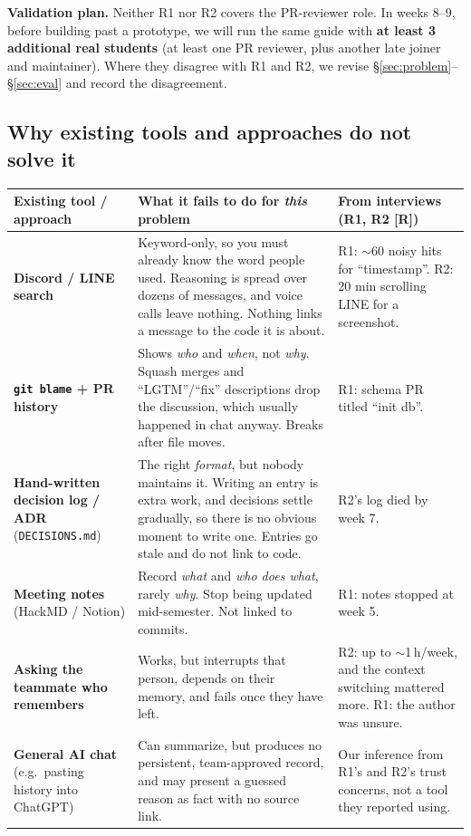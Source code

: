 \documentclass[11pt,a4paper]{article}
\newcommand{\code}[1]{\texttt{#1}}
\begin{document}
\textbf{Validation plan.} Neither R1 nor R2 covers the PR-reviewer role. In weeks 8--9, before building past a prototype, we will run the same guide with \textbf{at least 3 additional real students} (at least one PR reviewer, plus another late joiner and maintainer). Where they disagree with R1 and R2, we revise \S\ref{sec:problem}--\S\ref{sec:eval} and record the disagreement.

\subsection{Why existing tools and approaches do not solve it}\label{sec:existing}

{\small
\begin{tabularx}{\linewidth}{@{}>{\raggedright\arraybackslash}p{3.1cm}L>{\raggedright\arraybackslash}p{4.0cm}@{}}
\toprule
\textbf{Existing tool / approach} & \textbf{What it fails to do for \emph{this} problem} & \textbf{From interviews} (R1, R2 [R])\\
\midrule
\textbf{Discord / LINE search} & Keyword-only, so you must already know the word people used. Reasoning is spread over dozens of messages, and voice calls leave nothing. Nothing links a message to the code it is about. & R1: $\sim$60 noisy hits for ``timestamp''. R2: 20 min scrolling LINE for a screenshot.\\
\textbf{\code{git blame} + PR history} & Shows \emph{who} and \emph{when}, not \emph{why}. Squash merges and ``LGTM''/``fix'' descriptions drop the discussion, which usually happened in chat anyway. Breaks after file moves. & R1: schema PR titled ``init db''.\\
\textbf{Hand-written decision log / ADR} (\code{DECISIONS.md}) & The right \emph{format}, but nobody maintains it. Writing an entry is extra work, and decisions settle gradually, so there is no obvious moment to write one. Entries go stale and do not link to code. & R2's log died by week 7.\\
\textbf{Meeting notes} (HackMD / Notion) & Record \emph{what} and \emph{who does what}, rarely \emph{why}. Stop being updated mid-semester. Not linked to commits. & R1: notes stopped at week 5.\\
\textbf{Asking the teammate who remembers} & Works, but interrupts that person, depends on their memory, and fails once they have left. & R2: up to $\sim$1\,h/week, and the context switching mattered more. R1: the author was unsure.\\
\textbf{General AI chat} (e.g.\ pasting history into ChatGPT) & Can summarize, but produces no persistent, team-approved record, and may present a guessed reason as fact with no source link. & Our inference from R1's and R2's trust concerns, not a tool they reported using.\\
\bottomrule
\end{tabularx}
}
\end{document}
